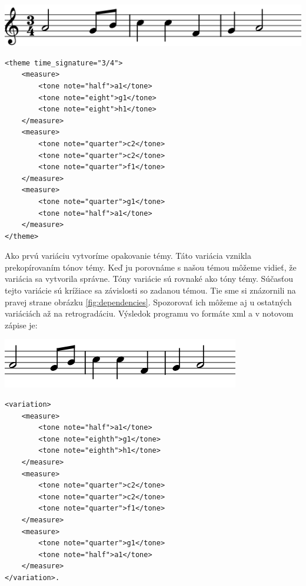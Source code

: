 \begin{minipage}{0.45\textwidth}
\includegraphics[width=\textwidth]{thesis/obrazky-figures/theme.png}
\end{minipage}%
\begin{minipage}{0.5\textwidth}
\centering
\lstset{language=XML}
\begin{lstlisting}[basicstyle=\tiny]
<theme time_signature="3/4">
    <measure>
        <tone note="half">a1</tone>
        <tone note="eight">g1</tone>
        <tone note="eight">h1</tone>
    </measure>
    <measure>
        <tone note="quarter">c2</tone>
        <tone note="quarter">c2</tone>
        <tone note="quarter">f1</tone>
    </measure>
    <measure>
        <tone note="quarter">g1</tone>
        <tone note="half">a1</tone>
    </measure>
</theme>
\end{lstlisting}
\end{minipage}

Ako prvú variáciu vytvoríme opakovanie témy. Táto variácia vznikla prekopírovaním tónov témy. Keď ju porovnáme s našou témou môžeme vidieť, že variácia sa vytvorila správne. Tóny variácie sú rovnaké ako tóny témy. Súčasťou tejto variácie sú krížiace sa závislosti so zadanou témou. Tie sme si znázornili na pravej strane obrázku \ref{fig:dependencies}. Spozorovať ich môžeme aj u ostatných variáciách až na retrogradáciu. Výsledok programu vo formáte xml a v notovom zápise je:

\begin{minipage}{.45\textwidth}
\includegraphics[width=\textwidth]{thesis/obrazky-figures/var1.png}
\end{minipage}%
\begin{minipage}{.5\textwidth}
\centering
\lstset{language=XML}
\begin{lstlisting}[basicstyle=\tiny]
<variation>
    <measure>
        <tone note="half">a1</tone>
        <tone note="eighth">g1</tone>
        <tone note="eighth">h1</tone>
    </measure>
    <measure>
        <tone note="quarter">c2</tone>
        <tone note="quarter">c2</tone>
        <tone note="quarter">f1</tone>
    </measure>
    <measure>
        <tone note="quarter">g1</tone>
        <tone note="half">a1</tone>
    </measure>
</variation>.
\end{lstlisting}
\end{minipage}

